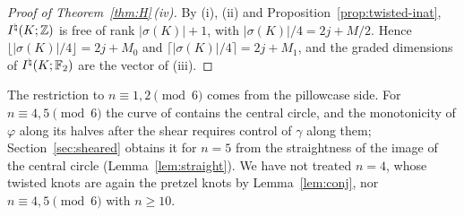 \begin{proof}[Proof of Theorem~\ref{thm:H}\,(iv)]
By (i), (ii) and Proposition~\ref{prop:twisted-inat}, $I^{\natural}(K;\mathbb{Z})$ is free of rank $|\sigma(K)|+1$, with
$|\sigma(K)|/4=2j+M/2$. Hence $\lfloor|\sigma(K)|/4\rfloor=2j+M_0$ and $\lceil|\sigma(K)|/4\rceil=2j+M_1$, and the graded
dimensions of $I^{\natural}(K;\mathbb{F}_2)$ are the vector of (iii).
\end{proof}

The restriction to $n\equiv1,2\pmod6$ comes from the pillowcase side. For $n\equiv4,5\pmod6$ the curve
of \cite{WuebbenV} contains the central circle, and the monotonicity of $\varphi$ along its halves after the
shear requires control of $\gamma$ along them; Section~\ref{sec:sheared} obtains it for $n=5$ from the
straightness of the image of the central circle (Lemma~\ref{lem:straight}). We have not treated $n=4$, whose twisted knots are again the pretzel knots by
Lemma~\ref{lem:conj}, nor $n\equiv4,5\pmod6$ with $n\ge10$.
